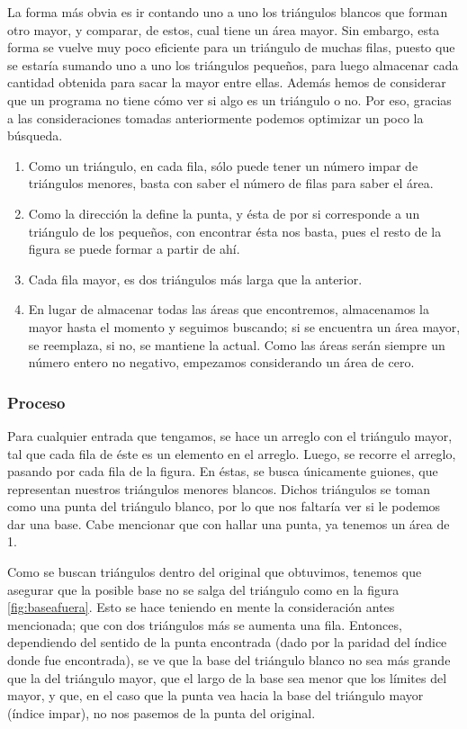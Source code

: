 \documentclass[letterpaper]{article}
\begin{document}
  La forma m\'as obvia es ir contando uno a uno los tri\'angulos blancos que forman
  otro mayor, y comparar, de estos, cual tiene un \'area mayor. Sin embargo, esta
  forma se vuelve muy poco eficiente para un tri\'angulo de muchas filas, puesto
  que se estar\'ia sumando uno a uno los tri\'angulos peque\~nos, para luego almacenar
  cada cantidad obtenida para sacar la mayor entre ellas. Adem\'as hemos de considerar
  que un programa no tiene c\'omo ver si algo es un tri\'angulo o no. Por eso, gracias
  a las consideraciones tomadas anteriormente podemos optimizar un poco la b\'usqueda.
  \begin{enumerate}
    \item Como un tri\'angulo, en cada fila, s\'olo puede tener un n\'umero impar de
    tri\'angulos menores, basta con saber el n\'umero de filas para saber el \'area.
    \item Como la direcci\'on la define la punta, y \'esta de por si corresponde a
    un tri\'angulo de los peque\~nos, con encontrar \'esta nos basta, pues el resto de la
    figura se puede formar a partir de ah\'i.
    \item Cada fila mayor, es dos tri\'angulos m\'as larga que la anterior.
    \item En lugar de almacenar todas las \'areas que encontremos, almacenamos la
    mayor hasta el momento y seguimos buscando; si se encuentra un \'area mayor, se
    reemplaza, si no, se mantiene la actual. Como las \'areas ser\'an siempre un
    n\'umero entero no negativo, empezamos considerando un \'area de cero.
  \end{enumerate}
\subsubsection{Proceso}
Para cualquier entrada que tengamos, se hace un arreglo con el tri\'angulo mayor,
tal que cada fila de \'este es un elemento en el arreglo. Luego, se recorre el
arreglo, pasando por cada fila de la figura. En \'estas, se busca \'unicamente guiones,
que representan nuestros tri\'angulos menores blancos. Dichos tri\'angulos se toman
como una punta del tri\'angulo blanco, por lo que nos faltar\'ia ver si le podemos
dar una base. Cabe mencionar que con hallar una punta, ya tenemos un \'area de 1.


Como se buscan tri\'angulos dentro del original que obtuvimos, tenemos que asegurar
que la posible base no se salga del tri\'angulo como en la figura \ref{fig:baseafuera}.
Esto se hace teniendo en mente la consideraci\'on antes mencionada; que con dos
tri\'angulos m\'as se aumenta una fila. Entonces, dependiendo del sentido de la
punta encontrada (dado por la paridad del \'indice donde fue encontrada), se ve
que la base del tri\'angulo blanco no sea m\'as grande que la del tri\'angulo
mayor, que el largo de la base sea menor que los l\'imites del mayor, y que, en
el caso que la punta vea hacia la base del tri\'angulo mayor (\'indice impar), no
nos pasemos de la punta del original.
\end{document}
